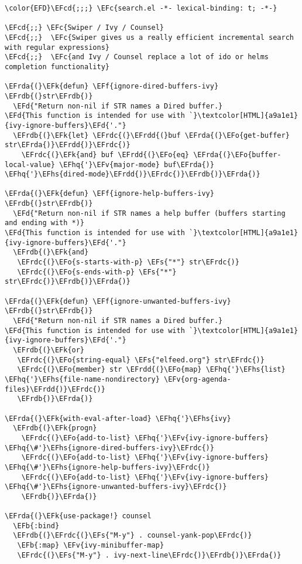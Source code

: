 \documentclass[a4wide,10pt]{article}
\newcommand{\EFc}[1]{\textcolor{EFc}{#1}} %
\newcommand{\EFcd}[1]{\textcolor{EFcd}{#1}} %
\newcommand{\EFs}[1]{\textcolor{EFs}{#1}} %
\newcommand{\EFd}[1]{\textcolor{EFd}{#1}} %
\newcommand{\EFk}[1]{\textcolor{EFk}{#1}} %
\newcommand{\EFb}[1]{\textcolor{EFb}{#1}} %
\newcommand{\EFf}[1]{\textcolor{EFf}{#1}} %
\newcommand{\EFv}[1]{\textcolor{EFv}{#1}} %
\newcommand{\EFo}[1]{\textcolor{EFo}{#1}} %
\newcommand{\EFhq}[1]{\textcolor{EFhq}{#1}} %
\newcommand{\EFhs}[1]{\textcolor{EFhs}{#1}} %
\newcommand{\EFrda}[1]{\textcolor{EFrda}{#1}} %
\newcommand{\EFrdb}[1]{\textcolor{EFrdb}{#1}} %
\newcommand{\EFrdc}[1]{\textcolor{EFrdc}{#1}} %
\newcommand{\EFrdd}[1]{\textcolor{EFrdd}{#1}} %
\begin{document}
\begin{Code}
\begin{Verbatim}
\color{EFD}\EFcd{;;;} \EFc{search.el -*- lexical-binding: t; -*-}

\EFcd{;;} \EFc{Swiper / Ivy / Counsel}
\EFcd{;;}  \EFc{Swiper gives us a really efficient incremental search with regular expressions}
\EFcd{;;}  \EFc{and Ivy / Counsel replace a lot of ido or helms completion functionality}

\EFrda{(}\EFk{defun} \EFf{ignore-dired-buffers-ivy} \EFrdb{(}str\EFrdb{)}
  \EFd{"Return non-nil if STR names a Dired buffer.}
\EFd{This function is intended for use with `}\textcolor[HTML]{a9a1e1}{ivy-ignore-buffers}\EFd{'."}
  \EFrdb{(}\EFk{let} \EFrdc{(}\EFrdd{(}buf \EFrda{(}\EFo{get-buffer} str\EFrda{)}\EFrdd{)}\EFrdc{)}
    \EFrdc{(}\EFk{and} buf \EFrdd{(}\EFo{eq} \EFrda{(}\EFo{buffer-local-value} \EFhq{'}\EFv{major-mode} buf\EFrda{)} \EFhq{'}\EFhs{dired-mode}\EFrdd{)}\EFrdc{)}\EFrdb{)}\EFrda{)}

\EFrda{(}\EFk{defun} \EFf{ignore-help-buffers-ivy} \EFrdb{(}str\EFrdb{)}
  \EFd{"Return non-nil if STR names a help buffer (buffers starting and ending with *)}
\EFd{This function is intended for use with `}\textcolor[HTML]{a9a1e1}{ivy-ignore-buffers}\EFd{'."}
  \EFrdb{(}\EFk{and}
   \EFrdc{(}\EFo{s-starts-with-p} \EFs{"*"} str\EFrdc{)}
   \EFrdc{(}\EFo{s-ends-with-p} \EFs{"*"} str\EFrdc{)}\EFrdb{)}\EFrda{)}

\EFrda{(}\EFk{defun} \EFf{ignore-unwanted-buffers-ivy} \EFrdb{(}str\EFrdb{)}
  \EFd{"Return non-nil if STR names a Dired buffer.}
\EFd{This function is intended for use with `}\textcolor[HTML]{a9a1e1}{ivy-ignore-buffers}\EFd{'."}
  \EFrdb{(}\EFk{or}
   \EFrdc{(}\EFo{string-equal} \EFs{"elfeed.org"} str\EFrdc{)}
   \EFrdc{(}\EFo{member} str \EFrdd{(}\EFo{map} \EFhq{'}\EFhs{list} \EFhq{'}\EFhs{file-name-nondirectory} \EFv{org-agenda-files}\EFrdd{)}\EFrdc{)}
   \EFrdb{)}\EFrda{)}

\EFrda{(}\EFk{with-eval-after-load} \EFhq{'}\EFhs{ivy}
  \EFrdb{(}\EFk{progn}
    \EFrdc{(}\EFo{add-to-list} \EFhq{'}\EFv{ivy-ignore-buffers} \EFhq{\#'}\EFhs{ignore-dired-buffers-ivy}\EFrdc{)}
    \EFrdc{(}\EFo{add-to-list} \EFhq{'}\EFv{ivy-ignore-buffers} \EFhq{\#'}\EFhs{ignore-help-buffers-ivy}\EFrdc{)}
    \EFrdc{(}\EFo{add-to-list} \EFhq{'}\EFv{ivy-ignore-buffers} \EFhq{\#'}\EFhs{ignore-unwanted-buffers-ivy}\EFrdc{)}
    \EFrdb{)}\EFrda{)}

\EFrda{(}\EFk{use-package!} counsel
  \EFb{:bind}
  \EFrdb{(}\EFrdc{(}\EFs{"M-y"} . counsel-yank-pop\EFrdc{)}
   \EFb{:map} \EFv{ivy-minibuffer-map}
   \EFrdc{(}\EFs{"M-y"} . ivy-next-line\EFrdc{)}\EFrdb{)}\EFrda{)}


\end{Verbatim}
\end{Code}
\end{document}

